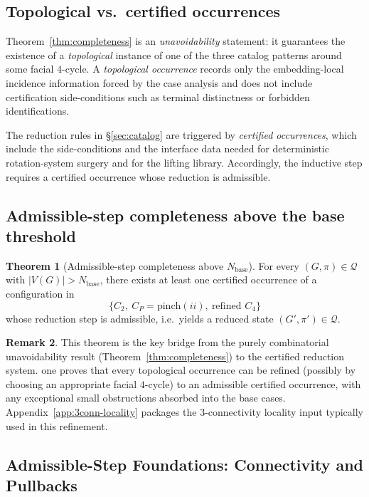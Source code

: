 \documentclass[12pt]{article}
\theoremstyle{definition}
\newtheorem{theorem}{Theorem}
\newtheorem{remark}[theorem]{Remark}
\begin{document}
\subsection{Topological vs.\ certified occurrences}
\label{subsec:topological-vs-certified}

Theorem~\ref{thm:completeness} is an \emph{unavoidability} statement: it guarantees the existence of a \emph{topological} instance of one of the three catalog patterns around some facial $4$-cycle.
A \emph{topological occurrence} records only the embedding-local incidence information forced by the case analysis and does not include certification side-conditions such as terminal distinctness or forbidden identifications.

The reduction rules in \S\ref{sec:catalog} are triggered by \emph{certified occurrences}, which include the side-conditions and the interface data needed for deterministic rotation-system surgery and for the lifting library.
Accordingly, the inductive step requires a certified occurrence whose reduction is admissible.

\subsection{Admissible-step completeness above the base threshold}
\label{subsec:admissible-completeness}

\begin{theorem}[Admissible-step completeness above $N_{\mathrm{base}}$]\label{thm:certified-completeness}
For every $(G,\pi)\in\mathcal{Q}$ with $|V(G)|>N_{\mathrm{base}}$, there exists at least one certified occurrence of a configuration in
\[
\{C_2,\ C_P=\mathrm{pinch}(ii),\ \text{refined }C_4\}
\]
whose reduction step is admissible, i.e.\ yields a reduced state $(G',\pi')\in\mathcal{Q}$.
\end{theorem}

\begin{remark}
This theorem is the key bridge from the purely combinatorial unavoidability result (Theorem~\ref{thm:completeness}) to the certified reduction system.
one proves that every topological occurrence can be refined (possibly by choosing an appropriate facial $4$-cycle) to an admissible certified occurrence, with any exceptional small obstructions absorbed into the base cases.
Appendix~\ref{app:3conn-locality} packages the $3$-connectivity locality input typically used in this refinement.
\end{remark}

\subsection{Admissible-Step Foundations: Connectivity and Pullbacks}
\label{subsec:existence-foundations}
\end{document}
